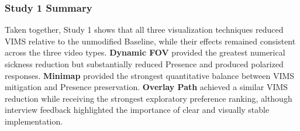 \subsubsection{Study 1 Summary}

Taken together, Study 1 shows that all three visualization techniques reduced VIMS relative to the unmodified Baseline, while their effects remained consistent across the three video types. \textbf{Dynamic FOV} provided the greatest numerical sickness reduction but substantially reduced Presence and produced polarized responses. \textbf{Minimap} provided the strongest quantitative balance between VIMS mitigation and Presence preservation. \textbf{Overlay Path} achieved a similar VIMS reduction while receiving the strongest exploratory preference ranking, although interview feedback highlighted the importance of clear and visually stable implementation.


